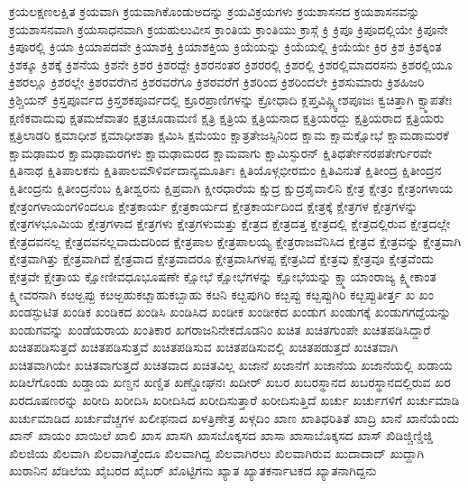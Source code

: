 {ಕ್ರಯಲಕ್ಷಣಲಕ್ಷಿತ
ಕ್ರಯವಾಗಿ
ಕ್ರಯವಾಗಿಕೊಂಡುಅದನ್ನು
ಕ್ರಯವಿಕ್ರಯಗಳು
ಕ್ರಯಶಾಸನದ
ಕ್ರಯಶಾಸನವನ್ನು
ಕ್ರಯಶಾಸನವಾಗಿ
ಕ್ರಯಸಾಧನವಾಗಿ
ಕ್ರಯಹುಲುವೀಸ
ಕ್ರಾಂತಿಯ
ಕ್ರಾಂತಿಯು
ಕ್ರಾಸ್ಗೆ
ಕ್ರಿ
ಕ್ರಿಪೂ
ಕ್ರಿಪೂದಲ್ಲಿಯೇ
ಕ್ರಿಪೂನೇ
ಕ್ರಿಪೂರಲ್ಲಿ
ಕ್ರಿಯಾ
ಕ್ರಿಯಾಪದವೇ
ಕ್ರಿಯಾಶಕ್ತಿ
ಕ್ರಿಯಾಶಕ್ತಿಯ
ಕ್ರಿಯೆಯನ್ನು
ಕ್ರಿಯೆಯಲ್ಲಿ
ಕ್ರಿಯೆಯೇ
ಕ್ರಿರ
ಕ್ರಿಶ
ಕ್ರಿಶಕ್ಕಿಂತ
ಕ್ರಿಶಕ್ಕೂ
ಕ್ರಿಶಕ್ಕೆ
ಕ್ರಿಶನೆಯ
ಕ್ರಿಶನೇ
ಕ್ರಿಶರ
ಕ್ರಿಶರದ್ದೇ
ಕ್ರಿಶರನಂತರ
ಕ್ರಿಶರರಲ್ಲಿ
ಕ್ರಿಶರಲ್ಲಿ
ಕ್ರಿಶರಲ್ಲಿಮಾದರಸನು
ಕ್ರಿಶರಲ್ಲಿಯೂ
ಕ್ರಿಶರಲ್ಲೂ
ಕ್ರಿಶರಲ್ಲೇ
ಕ್ರಿಶರವರೆಗಿನ
ಕ್ರಿಶರವರೆಗೂ
ಕ್ರಿಶರವರೆಗೆ
ಕ್ರಿಶರಿಂದ
ಕ್ರಿಶರಿಂದಲೇ
ಕ್ರಿಶಸುಮಾರು
ಕ್ರಿಶಹಿಜರಿ
ಕ್ರಿಶ್ಚಿಯನ್
ಕ್ರಿಸ್ತಪೂರ್ವದ
ಕ್ರಿಸ್ತಶಕಪೂರ್ವದಲ್ಲಿ
ಕ್ರೂರಪ್ರಾಣಿಗಳನ್ನು
ಕ್ರೋಧಾದಿ
ಕ್ಲಪ್ತವಿಷ್ಣ್ವೀಶಪೂಜಃ
ಕ್ವಚಿತ್ತಾಗಿ
ಕ್ವ್ಮಾಪತೇಃ
ಕ್ಷಣಿಕವಾದುವು
ಕ್ಷತಮಱೆವಾತಂ
ಕ್ಷತ್ರಚೂಡಾಮಣಿ
ಕ್ಷತ್ರಿ
ಕ್ಷತ್ರಿಯ
ಕ್ಷತ್ರಿಯನಾದ
ಕ್ಷತ್ರಿಯರದ್ದು
ಕ್ಷತ್ರಿಯರಾದ
ಕ್ಷತ್ರಿಯರು
ಕ್ಷತ್ರಿಲಾಡರಿ
ಕ್ಷಮಾಧೀಶ
ಕ್ಷಮಾಧೀಶತಾ
ಕ್ಷಮಿಸಿ
ಕ್ಷಮೆಯಂ
ಕ್ಷಾತ್ರತೇಜಸ್ಸಿನಿಂದ
ಕ್ಷಾಮ
ಕ್ಷಾಮಕ್ಷೋಭೆ
ಕ್ಷಾಮಡಾಮರಕೆ
ಕ್ಷಾಮಢಾಮರ
ಕ್ಷಾಮಢಾಮರಗಳು
ಕ್ಷಾಮಢಾಮರದ
ಕ್ಷಾಮವಾಗು
ಕ್ಷಾಮಿಸ್ಫುರನ್
ಕ್ಷಿತಿಧರ್ತೇನರಪತೇರ್ಗುರವೇ
ಕ್ಷಿತಿನಾಥ
ಕ್ಷಿತಿಪಾಲಕನು
ಕ್ಷಿತಿಪಾಲಮೌಳಿರ್ವದಾನ್ಯಮೂರ್ತಿಃ
ಕ್ಷಿತಿಯೊಳ್ಗಭೀರಮಂ
ಕ್ಷಿತಿವಿನುತೆ
ಕ್ಷಿತೀಂದ್ರ
ಕ್ಷಿತೀಂದ್ರನ
ಕ್ಷಿತೀಂದ್ರನು
ಕ್ಷಿತೀಂದ್ರನೆಂಬ
ಕ್ಷಿತೀಶ್ವರನು
ಕ್ಷಿಪ್ರವಾಗಿ
ಕ್ಷೀರಧಾರೆಯ
ಕ್ಷುದ್ರ
ಕ್ಷುದ್ರಶೈವಾಲಿನಿ
ಕ್ಷೇತ್ರ
ಕ್ಷೇತ್ರಂ
ಕ್ಷೇತ್ರಂಗಳಾಯ
ಕ್ಷೇತ್ರಂಗಳಾಯಂಗಳಿಂದಲೂ
ಕ್ಷೇತ್ರಕಾರ್ಯ
ಕ್ಷೇತ್ರಕಾರ್ಯದ
ಕ್ಷೇತ್ರಕಾರ್ಯದಿಂದ
ಕ್ಷೇತ್ರಕ್ಕೆ
ಕ್ಷೇತ್ರಗಳ
ಕ್ಷೇತ್ರಗಳನ್ನು
ಕ್ಷೇತ್ರಗಳಭೂಮಿಯ
ಕ್ಷೇತ್ರಗಳಾದ
ಕ್ಷೇತ್ರಗಳು
ಕ್ಷೇತ್ರಗಳುಮತ್ತು
ಕ್ಷೇತ್ರದ
ಕ್ಷೇತ್ರದತ್ತ
ಕ್ಷೇತ್ರದಲ್ಲಿ
ಕ್ಷೇತ್ರದಲ್ಲಿರುವ
ಕ್ಷೇತ್ರದಲ್ಲೇ
ಕ್ಷೇತ್ರದವನಲ್ಲ
ಕ್ಷೇತ್ರದವನಲ್ಲವಾದುದರಿಂದ
ಕ್ಷೇತ್ರಪಾಲ
ಕ್ಷೇತ್ರಪಾಲಯ್ಯ
ಕ್ಷೇತ್ರರಾಜವೆನಿಸಿದ
ಕ್ಷೇತ್ರವ
ಕ್ಷೇತ್ರವನ್ನು
ಕ್ಷೇತ್ರವಾಗಿ
ಕ್ಷೇತ್ರವಾಗಿತ್ತು
ಕ್ಷೇತ್ರವಾಗಿದೆ
ಕ್ಷೇತ್ರವಾದ
ಕ್ಷೇತ್ರವಾದರೂ
ಕ್ಷೇತ್ರವಾಸಿಗಳಪ್ಪ
ಕ್ಷೇತ್ರವಿದೆ
ಕ್ಷೇತ್ರವು
ಕ್ಷೇತ್ರವೂ
ಕ್ಷೇತ್ರವೆಂದು
ಕ್ಷೇತ್ರವೇ
ಕ್ಷೇತ್ರಾಯ
ಕ್ಷೋಣೀವಧೂಭೂಷಣೇ
ಕ್ಷೋಭೆ
ಕ್ಷೋಭೆಗಳನ್ನು
ಕ್ಷೋಭೆಯನ್ನು
ಕ್ಷ್ಮಾಯಾಂರಾಜ್ಯ
ಕ್ಷ್ಮೀಕಾಂತ
ಕ್ಷ್ಮೀವರನಾಗಿ
ಕೞಅ್ಬಪ್ಪು
ಕೞಅ್ಬಹುಕೞ್ಬಾಹುಕಬ್ಬಾಹು
ಕೞನಿ
ಕೞ್ಬಪುಗಿರಿ
ಕೞ್ಬಪ್ಪು
ಕೞ್ಬಪ್ಪುಗಿರಿ
ಕೞ್ಬಪ್ಪುತೀರ್ತ್ತ
ಖ
ಖಂ
ಖಂಡಸ್ಫುಟಿತ
ಖಂಡಿಕ
ಖಂಡಿಕದ
ಖಂಡಿಸಿ
ಖಂಡಿಸಿದ
ಖಂಡೀಕ
ಖಂಡೀಕದ
ಖಂಡುಗ
ಖಂಡುಗಕ್ಕೆ
ಖಂಡುಗಗದ್ದೆಯನ್ನು
ಖಂಡುಗವನ್ನು
ಖಂಡೆಯರಾಯ
ಖಂತಿಕಾರ
ಖಗರಾಜನಿನೇಕದೊಡನಿಂ
ಖಚಿತ
ಖಚಿತಗುಂಪೇ
ಖಚಿತಪಡಿಸಿದ್ದಾರೆ
ಖಚಿತಪಡಿಸುತ್ತದೆ
ಖಚಿತಪಡಿಸುತ್ತವೆ
ಖಚಿತಪಡಿಸುವ
ಖಚಿತಪಡಿಸುವಲ್ಲಿ
ಖಚಿತಪಡುತ್ತದೆ
ಖಚಿತವಾಗಿ
ಖಚಿತವಾಗಿಯೇ
ಖಚಿತವಾಗುತ್ತದೆ
ಖಚಿತವಾದ
ಖಚಿತವಿಲ್ಲ
ಖಜಾನೆ
ಖಜಾನೆಗೆ
ಖಜಾನೆಯ
ಖಜಾನೆಯಲ್ಲಿ
ಖಡಾಯ
ಖಡಿಲೆಗೊಂಡು
ಖಡ್ಡಾಯ
ಖಣ್ಡನ
ಖಣ್ಡಿತ
ಖಣ್ಡೋಘನಃ
ಖದೀರ್
ಖಬರ
ಖಬರಸ್ಥಾನದ
ಖಬರಸ್ಥಾನದಲ್ಲಿರುವ
ಖರ
ಖರದೂಷಣರನ್ನು
ಖರೀದಿ
ಖರೀದಿಸಿ
ಖರೀದಿಸಿದ
ಖರೀದಿಸುತ್ತಾರೆ
ಖರೀದಿಸುತ್ತಿದೆ
ಖರ್ಚು
ಖರ್ಚುಗಳಿಗೆ
ಖರ್ಚುಮಾಡಿ
ಖರ್ಚುಮಾಡಿದ
ಖರ್ಚುವೆಚ್ಚಗಳ
ಖಲೀಫನಾದ
ಖಳತ್ರಿಣೇತ್ರ
ಖಳ್ಗದಿಂ
ಖಾಣ
ಖಾತಿಧರಿತಿತೆ
ಖಾದ್ರಿ
ಖಾನೆ
ಖಾನೆಯೆಂದು
ಖಾನ್
ಖಾಯಂ
ಖಾಯಿಲೆ
ಖಾಲಿ
ಖಾಸ
ಖಾಸಗಿ
ಖಾಸಬೊಕ್ಕಸದ
ಖಾಸಾ
ಖಾಸಾಬೊಕ್ಕಸದ
ಖಾಸ್
ಖಿಡಿಜ್ಚಿಣ್ಡಿಜ್ಡಿ
ಖಿಲಜಿಯ
ಖಿಲವಾಗಿ
ಖಿಲವಾಗಿತ್ತೆಂದೂ
ಖಿಲವಾಗಿದ್ದ
ಖಿಲವಾಗಿರಲು
ಖಿಲವಾಗಿರುವ
ಖುದಾದಾದ್
ಖುದ್ದಾಗಿ
ಖುರಾನಿನ
ಖೆಡಿಲೆಯ
ಖೈಬರದ
ಖೈಬರ್
ಖೊಟ್ಟಿಗನು
ಖ್ಯಾತ
ಖ್ಯಾತಕರ್ನಾಟಕದ
ಖ್ಯಾತನಾಗಿದ್ದನು
}
